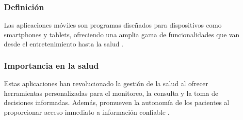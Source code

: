 \subsubsection{Definición}  
Las aplicaciones móviles son programas diseñados para dispositivos como smartphones y tablets, ofreciendo una amplia gama de funcionalidades que van desde el entretenimiento hasta la salud \parencite{marinescu2019mobileappdev}.

\subsubsection{Importancia en la salud}  
Estas aplicaciones han revolucionado la gestión de la salud al ofrecer herramientas personalizadas para el monitoreo, la consulta y la toma de decisiones informadas. Además, promueven la autonomía de los pacientes al proporcionar acceso inmediato a información confiable \parencite{marinescu2019mobileappdev}.
